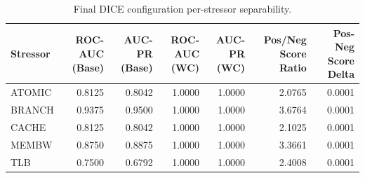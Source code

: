 \begin{table}[t]
\centering
\caption{Final DICE configuration per-stressor separability.}
\label{tab:dice_full_stressor}
\footnotesize
\begin{tabular}{lrrrrrr}
\toprule
Stressor & ROC-AUC (Base) & AUC-PR (Base) & ROC-AUC (WC) & AUC-PR (WC) & Pos/Neg Score Ratio & Pos-Neg Score Delta \\
\midrule
ATOMIC & 0.8125 & 0.8042 & 1.0000 & 1.0000 & 2.0765 & 0.0001 \\
BRANCH & 0.9375 & 0.9500 & 1.0000 & 1.0000 & 3.6764 & 0.0001 \\
CACHE & 0.8125 & 0.8042 & 1.0000 & 1.0000 & 2.1025 & 0.0001 \\
MEMBW & 0.8750 & 0.8875 & 1.0000 & 1.0000 & 3.3661 & 0.0001 \\
TLB & 0.7500 & 0.6792 & 1.0000 & 1.0000 & 2.4008 & 0.0001 \\
\bottomrule
\end{tabular}

\end{table}
